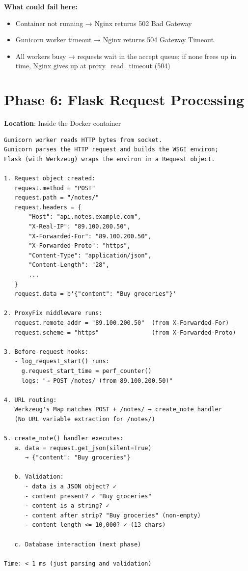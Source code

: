 \noindent{}\textbf{What could fail here:}

\begin{itemize}
\tightlist
\item
  Container not running → Nginx returns 502 Bad Gateway
\item
  Gunicorn worker timeout → Nginx returns 504 Gateway Timeout
\item
  All workers busy → requests wait in the accept queue; if none frees up in time, Nginx gives up at proxy\_read\_timeout (504)
\end{itemize}

\setcounter{section}{6}
\section{Phase 6: Flask Request Processing}\label{29-client-server-journey:297-phase-6-flask-request-processing}

\textbf{Location}: Inside the Docker container

\begin{outputbox}
\begin{Verbatim}[fontsize=\codesize, breaklines, breakanywhere, breaksymbolleft={\tiny\textcolor{muted}{$\hookrightarrow$}}]
Gunicorn worker reads HTTP bytes from socket.
Gunicorn parses the HTTP request and builds the WSGI environ;
Flask (with Werkzeug) wraps the environ in a Request object.

1. Request object created:
   request.method = "POST"
   request.path = "/notes/"
   request.headers = {
       "Host": "api.notes.example.com",
       "X-Real-IP": "89.100.200.50",
       "X-Forwarded-For": "89.100.200.50",
       "X-Forwarded-Proto": "https",
       "Content-Type": "application/json",
       "Content-Length": "28",
       ...
   }
   request.data = b'{"content": "Buy groceries"}'

2. ProxyFix middleware runs:
   request.remote_addr = "89.100.200.50"  (from X-Forwarded-For)
   request.scheme = "https"               (from X-Forwarded-Proto)

3. Before-request hooks:
   - log_request_start() runs:
     g.request_start_time = perf_counter()
     logs: "→ POST /notes/ (from 89.100.200.50)"

4. URL routing:
   Werkzeug's Map matches POST + /notes/ → create_note handler
   (No URL variable extraction for /notes/)

5. create_note() handler executes:
   a. data = request.get_json(silent=True)
      → {"content": "Buy groceries"}

   b. Validation:
      - data is a JSON object? ✓
      - content present? ✓ "Buy groceries"
      - content is a string? ✓
      - content after strip? "Buy groceries" (non-empty)
      - content length <= 10,000? ✓ (13 chars)

   c. Database interaction (next phase)

Time: < 1 ms (just parsing and validation)
\end{Verbatim}
\end{outputbox}


